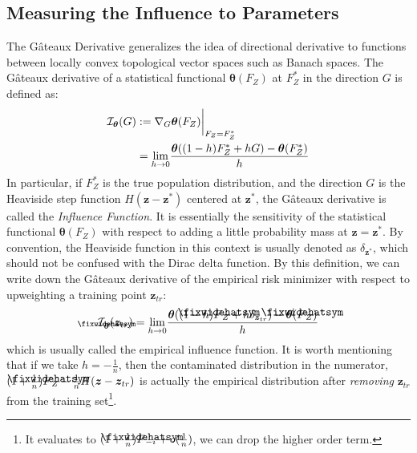 \documentclass{article}
\newcommand\lowerwidehatsym{%
  \text{\smash{\raisebox{-1.3ex}{%
    $\fixwidehatsym$}}}}
\newcommand\fixwidehat[1]{%
  \mathchoice
    {\accentset{\displaystyle\lowerwidehatsym}{#1}}
    {\accentset{\textstyle\lowerwidehatsym}{#1}}
    {\accentset{\scriptstyle\lowerwidehatsym}{#1}}
    {\accentset{\scriptscriptstyle\lowerwidehatsym}{#1}}
}
\begin{document}
\subsection{Measuring the Influence to Parameters}
The G\^ateaux Derivative generalizes the idea of directional derivative to functions between locally convex topological vector spaces such as Banach spaces. The G\^ateaux derivative of a statistical functional $\bm{\theta}(F_Z)$ at $F^*_Z$ in the direction $G$ is defined as:
\begin{align}\label{gateaux}
	\mathcal{I}_{\bm{\theta}}(G) &:= \nabla_{G} \bm{\theta}(F_Z)\biggr\rvert_{F_Z=F^*_Z} \notag\\
	&= \underset{h \to 0}{\lim}\frac{\bm{\theta}((1-h)F^*_Z + hG) - \bm{\theta}(F^*_Z)}{h}
\end{align}
In particular, if $F^*_Z$ is the true population distribution, and the direction $G$ is the Heaviside step function $H(\bm{z}-\bm{z}^*)$ centered at $\bm{z}^*$, the G\^ateaux derivative is called the \emph{Influence Function}. It is essentially the sensitivity of the statistical functional $\bm{\theta}(F_Z)$ with respect to adding a little probability mass at $\bm{z}=\bm{z}^*$. By convention, the Heaviside function in this context is usually denoted as $\delta_{\bm{z}^*}$, which should not be confused with the Dirac delta function. By this definition, we can write down the G\^ateaux derivative of the empirical risk minimizer with respect to upweighting a training point $\bm{z}_{tr}$: 
\vspace{-6pt}\begin{align}\label{empinfluence}
	\mathcal{I}_{\fixwidehat{\bm{\theta}}}(\bm{z}_{tr}) = \underset{h \to 0}{\lim}\frac{\bm{\theta}((1-h)\fixwidehat{F}_Z+ h\delta_{\bm{z}_{tr}}) - \bm{\theta}(\fixwidehat{F}_Z)}{h}
\end{align}
which is usually called the empirical influence function. It is worth mentioning that if we take $h=-\frac{1}{n}$, then the contaminated distribution in the numerator, $(1+\frac{1}{n})\fixwidehat{F}_Z - \frac{1}{n}H(\bm{z}-\bm{z}_{tr})$ is actually the empirical distribution after \emph{removing} $\bm{z}_{tr}$ from the training set\footnote{It evaluates to $(1+\frac{1}{n})\fixwidehat{F}_{-i} + o(\frac{1}{n})$, we can drop the higher order term.}.
\end{document}
